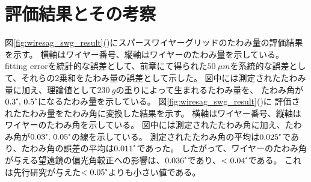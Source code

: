 \documentclass[../../main.tex]{subfiles}
\begin{document}
\section{評価結果とその考察}
図\ref{fig:wiresag_swg_result}()にスパースワイヤーグリッドのたわみ量の評価結果を示す。
横軸はワイヤー番号、縦軸はワイヤーのたわみ量を示している。
fitting errorを統計的な誤差として、前章にて得られた$\SI{50}{\mu m}$を系統的な誤差として、それらの2乗和をたわみ量の誤差として示した。
図中には測定されたたわみ量に加え、理論値として$\SI{230}{g}$の重りによって生まれるたわみ量を、
たわみ角が$0.3\tcdegree,\,0.5\tcdegree$になるたわみ量を示している。
図\ref{fig:wiresag_swg_result}()に
評価されたたわみ量をたわみ角に変換した結果を示す。
横軸はワイヤー番号、縦軸はワイヤーのたわみ角を示している。
図中には測定されたたわみ角に加え、たわみ角が$0.03\tcdegree,\,0.05\tcdegree$の線を示している。
測定されたたわみ角の平均は$0.025\tcdegree$であり、たわみ角の誤差の平均は$0.011\tcdegree$であった。
したがって、ワイヤーのたわみ角が与える望遠鏡の偏光角較正への影響は、$0.036\tcdegree$であり、$<0.04\tcdegree$である。 
これは先行研究が与えた$<0.05\tcdegree$よりも小さい値である。
\end{document}
